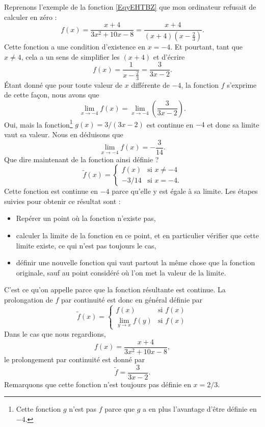 Reprenons l'exemple de la fonction \eqref{EqyEHTBZ} que mon ordinateur refusait de calculer en zéro :
\begin{equation}
f(x)=\frac{ x+4 }{ 3x^2+10x-8 }=\frac{ x+4 }{ (x+4)\left( x-\frac{ 2 }{ 3 } \right) }.
\end{equation}
Cette fonction a une condition d'existence en $x=-4$. Et pourtant, tant que $x\neq 4$, cela a un sens de simplifier les $(x+4)$ et d'écrire
\[
  f(x)=\frac{ 1 }{ x-\frac{ 2 }{ 3 } }=\frac{ 3 }{ 3x-2 }.
\]
Étant donné que pour toute valeur de $x$ différente de $-4$, la fonction $f$ s'exprime de cette façon, nous avons que
\[
  \lim_{x\to -4}f(x)=\lim_{x\to -4}\left(\frac{ 3 }{ 3x-2 }\right).
\]
Oui, mais la fonction\footnote{Cette fonction $g$ n'est pas $f$ parce que $g$ a en plus l'avantage d'être définie en $-4$.} $g(x)=3/(3x-2)$ est continue en $-4$ et donc sa limite vaut sa valeur. Nous en déduisons que
\[
  \lim_{x\to -4}f(x)=-\frac{ 3 }{ 14 }.
\]
Que dire maintenant de la fonction ainsi définie ?
\begin{equation}
\tilde f(x)=
\begin{cases}
f(x)&\text{si }x\neq -4\\
-3/14&\text{si }x=-4.
\end{cases}
\end{equation}
Cette fonction est continue en $-4$ parce qu'elle y est égale à sa limite. Les étapes suivies pour obtenir ce résultat sont :
\begin{itemize}
\item Repérer un point où la fonction n'existe pas,
\item calculer la limite de la fonction en ce point, et en particulier vérifier que cette limite existe, ce qui n'est pas toujours le cas,
\item définir une nouvelle fonction qui vaut partout la même chose que la fonction originale, sauf au point considéré où l'on met la valeur de la limite.
\end{itemize}
C'est ce qu'on appelle  parce que la fonction résultante est continue. La prolongation de $f$ par continuité est donc en général définie par
\begin{equation}
\tilde f(x)=
\begin{cases}
f(x)            &\text{si }f(x)\\
\lim_{y\to x}f(y)   &\text{si }f(x)
\end{cases}
\end{equation}
Dans le cas que nous regardions,
\[
    f(x)=\frac{ x+4 }{ 3x^2+10x-8 },
\]
le prolongement par continuité est donné par
\begin{equation}
\tilde f =\frac{ 3 }{ 3x-2 }.
\end{equation}
Remarquons que cette fonction n'est toujours pas définie en $x=2/3$.

